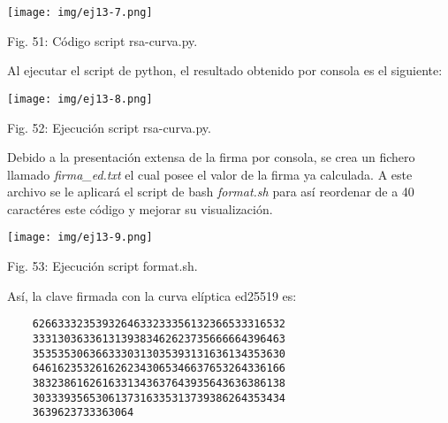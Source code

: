 \documentclass[12pt,oneside,a4paper]{book}
\begin{document}
\begin{center}
    \texttt{[image: img/ej13-7.png]}
    
\vspace{0.1em}
    
    Fig. 51: Código script rsa-curva.py.
\end{center}

\vspace{2em}

\hspace{20pt}
Al ejecutar el script de python, el resultado obtenido por consola es el siguiente:

\vspace{2em}

\begin{center}
    \texttt{[image: img/ej13-8.png]}
    
\vspace{0.1em}
    
    Fig. 52: Ejecución script rsa-curva.py.
\end{center}

\vspace{2em}

\hspace{20pt}
Debido a la presentación extensa de la firma por consola, se crea un fichero llamado \textit{firma\_ed.txt} el cual posee el valor de la firma ya calculada. A este archivo se le aplicará el script de bash \textit{format.sh} para así reordenar de a 40 caractéres este código y mejorar su visualización.

\vspace{2em}

\begin{center}
    \texttt{[image: img/ej13-9.png]}
    
\vspace{0.1em}
    
    Fig. 53: Ejecución script format.sh.
\end{center}

\vspace{2em}

\hspace{20pt}
Así, la clave firmada con la curva elíptica ed25519 es:

\begin{verbatim}
    6266333235393264633233356132366533316532
    3331303633613139383462623735666664396463
    3535353063663330313035393131636134353630
    6461623532616262343065346637653264336166
    3832386162616331343637643935643636386138
    3033393565306137316335313739386264353434
    3639623733363064
\end{verbatim}
\end{document}
